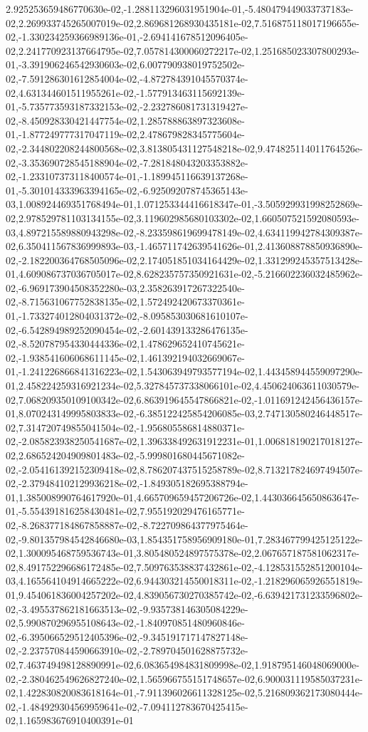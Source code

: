 2.925253659486770630e-02,-1.288113296031951904e-01,-5.480479449033737183e-02,2.269933745265007019e-02,2.869681268930435181e-02,7.516875118017196655e-02,-1.330234259366989136e-01,-2.694141678512096405e-02,2.241770923137664795e-02,7.057814300060272217e-02,1.251685023307800293e-01,-3.391906246542930603e-02,6.007790938019752502e-02,-7.591286301612854004e-02,-4.872784391045570374e-02,4.631344601511955261e-02,-1.577913463115692139e-01,-5.735773593187332153e-02,-2.232786081731319427e-02,-8.450928330421447754e-02,1.285788863897323608e-01,-1.877249777317047119e-02,2.478679828345775604e-02,-2.344802208244800568e-02,3.813805431127548218e-02,9.474825114011764526e-02,-3.353690728545188904e-02,-7.281848043203353882e-02,-1.233107373118400574e-01,-1.189945116639137268e-01,-5.301014333963394165e-02,-6.925092078745365143e-03,1.008924469351768494e-01,1.071253344416618347e-01,-3.505929931998252869e-02,2.978529781103134155e-02,3.119602985680103302e-02,1.660507521592080593e-03,4.897215589880943298e-02,-8.233598619699478149e-02,4.634119942784309387e-02,6.350411567836999893e-03,-1.465711742639541626e-01,2.413608878850936890e-02,-2.182200364768505096e-02,2.174051851034164429e-02,1.331299245357513428e-01,4.609086737036705017e-02,8.628235757350921631e-02,-5.216602236032485962e-02,-6.969173904508352280e-03,2.358263917267322540e-02,-8.715631067752838135e-02,1.572492420673370361e-01,-1.733274012804031372e-02,-8.095853030681610107e-02,-6.542894989252090454e-02,-2.601439133286476135e-02,-8.520787954330444336e-02,1.478629652410745621e-02,-1.938541606068611145e-02,1.461392194032669067e-01,-1.241226866841316223e-02,1.543063949793577194e-02,1.443458944559097290e-01,2.458224259316921234e-02,5.327845737338066101e-02,4.450624063611030579e-02,7.068209350109100342e-02,6.863919645547866821e-02,-1.011691242456436157e-01,8.070243149995803833e-02,-6.385122425854206085e-03,2.747130580246448517e-02,7.314720749855041504e-02,-1.956805586814880371e-02,-2.085823938250541687e-02,1.396338492631912231e-01,1.006818190217018127e-02,2.686524204909801483e-02,-5.999801680445671082e-02,-2.054161392152309418e-02,8.786207437515258789e-02,8.713217824697494507e-02,-2.379484102129936218e-02,-1.849305182695388794e-01,1.385008990764617920e-01,4.665709659457206726e-02,1.443036645650863647e-01,-5.554391816258430481e-02,7.955192029476165771e-02,-8.268377184867858887e-02,-8.722709864377975464e-02,-9.801357984542846680e-03,1.854351758956909180e-01,7.283467799425125122e-02,1.300095468759536743e-01,3.805480524897575378e-02,2.067657187581062317e-02,8.491752296686172485e-02,7.509763538837432861e-02,-4.128531552851200104e-03,4.165564104914665222e-02,6.944303214550018311e-02,-1.218296065926551819e-01,9.454061836004257202e-02,4.839056730270385742e-02,-6.639421731233596802e-02,-3.495537862181663513e-02,-9.935738146305084229e-02,5.990870296955108643e-02,-1.840970851480960846e-02,-6.395066529512405396e-02,-9.345191717147827148e-02,-2.237570844590663910e-02,-2.789704501628875732e-02,7.463749498128890991e-02,6.083654984831809998e-02,1.918795146048069000e-02,-2.380462549626827240e-02,1.565966755151748657e-02,6.900031119585037231e-02,1.422830820083618164e-01,-7.911396026611328125e-02,5.216809362173080444e-02,-1.484929304569959641e-02,-7.094112783670425415e-02,1.165983676910400391e-01
